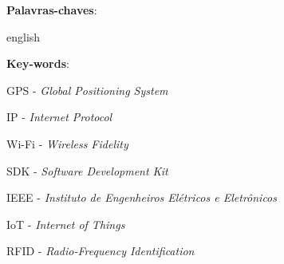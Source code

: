 
\setlength{\absparsep}{18pt} %
\begin{resumo}


    \textbf{Palavras-chaves}:

\end{resumo}

\begin{resumo}[Abstract]
    \begin{otherlanguage*}{english}

        \vspace{\onelineskip}

        \noindent
        \textbf{Key-words}:
    \end{otherlanguage*}
\end{resumo}


\listoffigures*


\begin{siglas}

    \item GPS - \textit{Global Positioning System}
    \item IP - \textit{Internet Protocol}
    \item Wi-Fi - \textit{Wireless Fidelity}
    \item SDK - \textit{Software Development Kit}
    \item IEEE - \textit{Instituto de Engenheiros Elétricos e Eletrônicos}
    \item IoT - \textit{Internet of Things}
    \item RFID - \textit{Radio-Frequency Identification}

\end{siglas}


\tableofcontents*
\cleardoublepage

